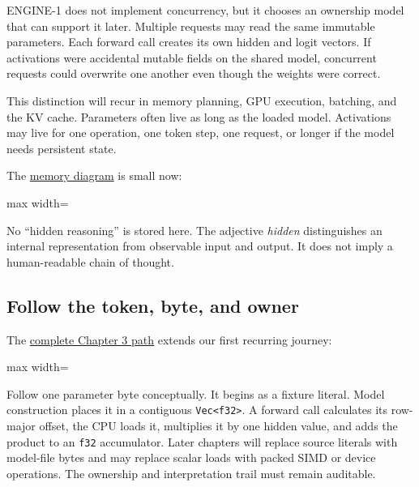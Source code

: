 \documentclass[
  10pt,
]{article}
\begin{document}
ENGINE-1 does not implement concurrency, but it chooses an ownership
model that can support it later. Multiple requests may read the same
immutable parameters. Each forward call creates its own hidden and logit
vectors. If activations were accidental mutable fields on the shared
model, concurrent requests could overwrite one another even though the
weights were correct.

This distinction will recur in memory planning, GPU execution, batching,
and the KV cache. Parameters often live as long as the loaded model.
Activations may live for one operation, one token step, one request, or
longer if the model needs persistent state.

The
\href{https://github.com/hermonai/inside-the-llm-engine/blob/astra-visual-rewrite/diagrams/model/parameters-vs-activations.txt}{memory
diagram} is small now:

\begin{center}\begin{adjustbox}{max width=\linewidth}\end{adjustbox}\end{center}

No ``hidden reasoning'' is stored here. The adjective \emph{hidden}
distinguishes an internal representation from observable input and
output. It does not imply a human-readable chain of thought.

\subsection{Follow the token, byte, and
owner}\label{follow-the-token-byte-and-owner}

The
\href{https://github.com/hermonai/inside-the-llm-engine/blob/astra-visual-rewrite/diagrams/model/token-id-to-logits.txt}{complete
Chapter 3 path} extends our first recurring journey:

\begin{center}\begin{adjustbox}{max width=\linewidth}\end{adjustbox}\end{center}

Follow one parameter byte conceptually. It begins as a fixture literal.
Model construction places it in a contiguous
\texttt{Vec\textless{}f32\textgreater{}}. A forward call calculates its
row-major offset, the CPU loads it, multiplies it by one hidden value,
and adds the product to an \texttt{f32} accumulator. Later chapters will
replace source literals with model-file bytes and may replace scalar
loads with packed SIMD or device operations. The ownership and
interpretation trail must remain auditable.
\end{document}

